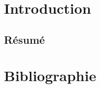 \documentclass[12pt,a4paper]{article}
\begin{document}
\newpage
\section{Introduction}
\subsection{Résumé}

\newpage




\section{Bibliographie}
\printbibliography
\end{document}
